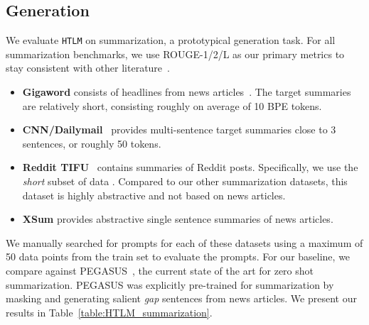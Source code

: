 \documentclass[11pt,a4paper]{article}
\newif\ifshownlg
\newcommand{\HTLM}{\texttt{HTLM}}
\begin{document}
\subsection{Generation}
We evaluate \HTLM{} on summarization, a prototypical generation task. For all summarization benchmarks, we use ROUGE-1/2/L as our primary metrics to stay consistent with other literature~\citep{ROUGE}. 

\ifshownlg
Furthermore we benchmark \HTLM{} on a set of three standard natural language generation tasks. We utilize the official benchmarking scripts provided which report BLEU \citep{bleu}, NIST \citep{NIST}, METEOR \citep{METEOR}, ROUGE-L \citep{ROUGE},
CIDEr \citep{cider} and TER \citep{ter}. We use \citet{prefixtuning} for our baselines, and present prefix tuning results with 0.1\% of parameters as well.
\fi
\begin{itemize}[label={},leftmargin=0pt]
\item \textbf{Gigaword} consists of headlines from news articles~\citep{gigaword}. The target summaries are relatively short, consisting roughly on average of 10 BPE tokens.

\item \textbf{CNN/Dailymail}~\citep{cnndailymail}
 provides multi-sentence target summaries close to 3 sentences, or roughly 50 tokens.

\item \textbf{Reddit TIFU}~\citep{reddittifu}
contains summaries of Reddit posts. Specifically, we use the \textit{short} subset of data . Compared to our other summarization datasets, this dataset is highly abstractive and not based on news articles.

\item \textbf{XSum} \citep{xsum} provides abstractive single sentence summaries of news articles.

\ifshownlg
\item \textbf{E2E} \cite{e2e_nlg} is a table-to-text generation dataset containing approximately 50K
samples with 8 unique fields from the restaurants domain. 
\item \textbf{WebNLG} \cite{webnlg} is also a structured generation dataset containing 15 different domains from DBPedia. We report numbers on the Seen (S), Unseen (U) and All (A) subsets of the data.
\item \textbf{DART} \cite{dartnlg} is a open-domain structured generation dataset containing Wikipedia tables.
\fi
\end{itemize}
We manually searched for prompts for each of these datasets using a maximum of 50 data points from the train set to evaluate the prompts.
For our baseline, we compare against PEGASUS~\citep{pegasus}, the current state of the art for zero shot summarization. PEGASUS was explicitly pre-trained for summarization by masking and generating salient \emph{gap} sentences from news articles.
We present our results in Table~\ref{table:HTLM_summarization}.
\end{document}
